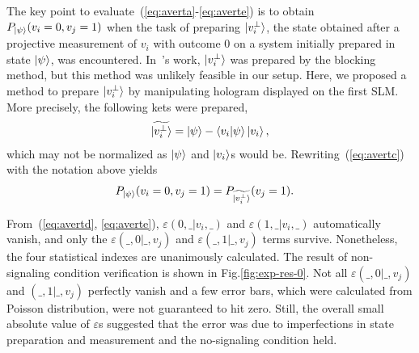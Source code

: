 \documentclass[pra,aps,notitlepage,superscriptaddress,showpacs,showkeys]{revtex4-1}
\theoremstyle{definition}
\theoremstyle{remark}
\begin{document}
 The key point to evaluate~(\ref{eq:averta}-\ref{eq:averte}) is to obtain $P_{\ket{\psi}} (v_i = 0, v_j = 1)$ when the task of preparing $\ket{v_i^\perp}$, the state obtained after a projective measurement of $v_i$ with outcome 0 on a system initially prepared in state $\ket{\psi}$, was encountered. In~\cite{yxiao17s}'s work, $\ket{v_i^\perp}$ was prepared by the blocking method, but this method was unlikely feasible in our setup.
 Here, we proposed a method to prepare $\ket{v_i^\perp}$ by manipulating hologram displayed on the first SLM. More precisely, the following kets were prepared,
 \begin{align}
        \widetilde{\ket{v_i^\perp}} = \ket{\psi} - \braket{v_i|\psi}\ket{v_i},
\end{align}
 which may not be normalized as $\ket{\psi}$ and $\ket{v_i}$s would be. Rewriting~(\ref{eq:avertc}) with the notation above yields
\begin{align}
        P_{\ket{\psi}} (v_i = 0, v_j = 1) &= P_{\widetilde{\ket{v_i^\perp}}} (v_j = 1).
\end{align}


 From~(\ref{eq:avertd}, \ref{eq:averte}), $\varepsilon(0, \_|v_i, \_)$ and $\varepsilon(1, \_|v_i, \_)$ automatically vanish, and only the $\varepsilon(\_, 0|\_, v_j)$ and $\varepsilon(\_, 1|\_, v_j)$ terms survive. Nonetheless, the four statistical indexes are unanimously calculated.
 The result of non-signaling condition verification is shown in Fig.\ref{fig:exp-res-0}. Not all $\varepsilon(\_, 0|\_, v_j)$ and $(\_, 1|\_, v_j)$ perfectly vanish and a few error bars, which were calculated from Poisson distribution, were not guaranteed to hit zero.
 Still, the overall small absolute value of $\varepsilon$s suggested that the error was due to imperfections in state preparation and measurement and the no-signaling condition held.
\end{document}
